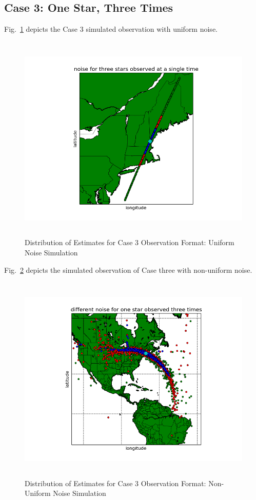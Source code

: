 \documentclass[12pt,a4paper]{book}
\begin{document}
\subsection*{Case 3: One Star, Three Times}
Fig.~\ref{f:1s3t_case1_noise} depicts the Case 3 simulated observation with uniform noise.  
\begin{figure}[!htb]
\centering
\includegraphics[height=10cm]{1s3t_case1_noise.png}
\caption{Distribution of Estimates for Case 3 Observation Format: Uniform Noise Simulation}
\label{f:1s3t_case1_noise}
\end{figure}
Fig.~\ref{f:1s3t_case2_noise} depicts the simulated observation of Case three with non-uniform noise.
\begin{figure}[!htb]
\centering
\includegraphics[height=10cm]{1s3t_case2_noise.png}
\caption{Distribution of Estimates for Case 3 Observation Format: Non-Uniform Noise Simulation }
\label{f:1s3t_case2_noise}
\end{figure}
\end{document}
